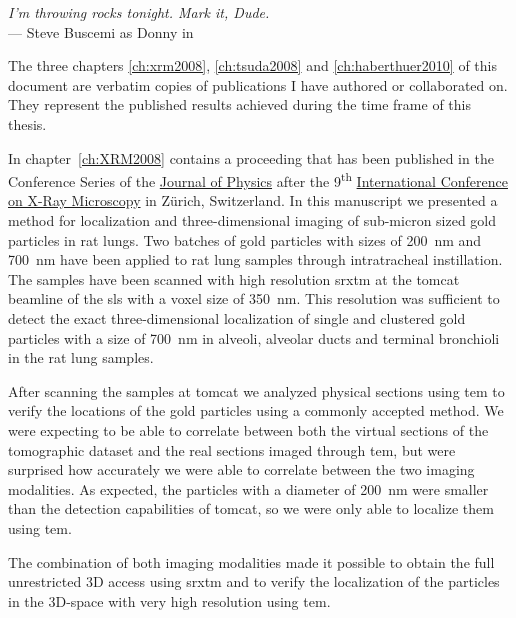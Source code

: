 \acresetall
{}
\label{ch:publications}
\begin{flushright}{\slshape I'm throwing rocks tonight. Mark it, Dude.} \\ \medskip
    --- Steve Buscemi as Donny in \citep{TheBigLebowski}
\end{flushright}
\vspace{52mm}

The three chapters \ref{ch:xrm2008}, \ref{ch:tsuda2008} and \ref{ch:haberthuer2010} of this document are verbatim copies of publications I have authored or collaborated on. They represent the published results achieved during the time frame of this thesis.

In chapter~\ref{ch:XRM2008} contains a proceeding that has been published in the Conference Series of the \href{http://iopscience.iop.org/1742-6596/}{Journal of Physics} after the 9\textsuperscript{th} \href{http://xrm2008.web.psi.ch/}{International Conference on X-Ray Microscopy} in Zürich, Switzerland. In this manuscript we presented a method for localization and three-dimensional imaging of sub-micron sized gold particles in rat lungs. Two batches of gold particles with sizes of \SI{200}{\nano\meter} and \SI{700}{\nano\meter} have been applied to rat lung samples through intratracheal instillation. The samples have been scanned with high resolution \ac{srxtm} at the \ac{tomcat} beamline of the \ac{sls} with a voxel size of \SI{350}{\nano\meter}. This resolution was sufficient to detect the exact three-dimensional localization of single and clustered gold particles with a size of \SI{700}{\nano\meter} in alveoli, alveolar ducts and terminal bronchioli in the rat lung samples.

After scanning the samples at \ac{tomcat} we analyzed physical sections using \ac{tem} to verify the locations of the gold particles using a commonly accepted method. We were expecting to be able to correlate between both the virtual sections of the tomographic dataset and the real sections imaged through \ac{tem}, but were surprised how accurately we were able to correlate between the two imaging modalities. As expected, the particles with a diameter of \SI{200}{\nano\meter} were smaller than the detection capabilities of \ac{tomcat}, so we were only able to localize them using \ac{tem}.

The combination of both imaging modalities made it possible to obtain the full
unrestricted 3D access using \ac{srxtm} and to verify the localization of the particles in the 3D-space with very high resolution using \ac{tem}.

